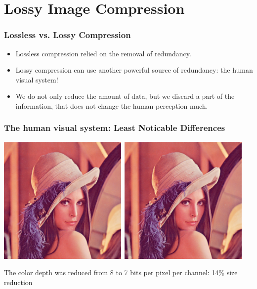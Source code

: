 \documentclass{beamer}
\begin{document}
\section{Lossy Image Compression}

\begin{frame}
\frametitle{Lossless vs. Lossy Compression}

\begin{itemize}
\item Lossless compression relied on the removal of redundancy. %
\item Lossy compression can use another powerful source of redundancy: the human
  visual system!
\item We do not only reduce the amount of data, but we discard a part of the
  information, that does not change the human perception much.
\end{itemize}
\end{frame}


\begin{frame}
\frametitle{The human visual system: Least Noticable Differences}

\includegraphics[width=0.47\textwidth]{lena}\ 
\includegraphics[width=0.47\textwidth]{lena-2}

The color depth was reduced from 8 to 7 bits per pixel per channel: 14\% size reduction
\end{frame}
\end{document}
